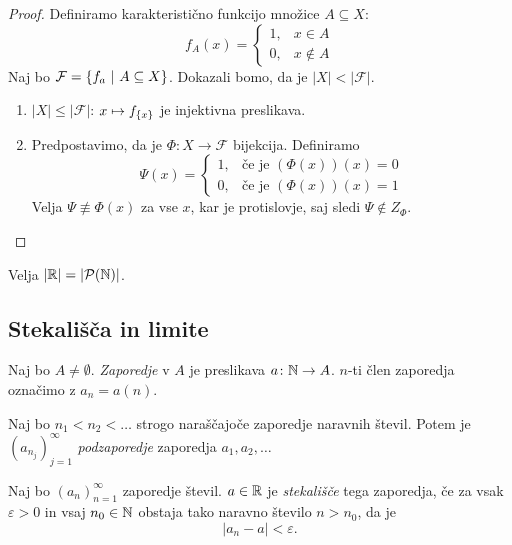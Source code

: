\documentclass[12pt, a4paper]{article}
\begin{document}
\begin{proof}
Definiramo karakteristično funkcijo množice $A\subseteq X$:
\[
f_A(x)=\begin{cases}
1, &x\in A\\
0, &x\not\in A
\end{cases}
\]
Naj bo $\mathcal{F}=\left\{f_a~\middle\vert~A\subseteq X\right\}$. Dokazali bomo, da je $|X|<|\mathcal{F}|$.

\begin{enumerate}[label=\arabic*)]
\item $|X|\leq|\mathcal{F}|$: $x\mapsto f_{\left\{x\right\}}$ je injektivna preslikava.
\item Predpostavimo, da je $\Phi:X\to\mathcal{F}$ bijekcija. Definiramo
\[
\Psi(x)=\begin{cases}
1, &\text{če je $(\Phi(x))(x)=0$}\\
0, &\text{če je $(\Phi(x))(x)=1$}
\end{cases}
\]
Velja $\Psi\not\equiv\Phi(x)$ za vse $x$, kar je protislovje, saj sledi $\Psi\not\in Z_{\Phi}$.\qedhere
\end{enumerate}
\end{proof}

\begin{opomba}
Velja $|\mathbb{R}|=|\mathcal{P}(\mathbb{N})|$.
\end{opomba}

\newpage

\subsection{Stekališča in limite}

\begin{okvir}
\begin{definicija}
Naj bo $A\ne\emptyset$. \emph{Zaporedje} v $A$ je preslikava $a\colon \mathbb{N}\to A$. $n$-ti člen zaporedja označimo z $a_n=a(n)$.
\end{definicija}
\end{okvir}

\begin{definicija}
Naj bo $n_1<n_2<\dots$ strogo naraščajoče zaporedje naravnih števil. Potem je $(a_{n_j})_{j=1}^\infty$ \emph{podzaporedje} zaporedja $a_1,a_2,\dots$
\end{definicija}

\begin{definicija}
Naj bo $(a_n)_{n=1}^\infty$ zaporedje števil. $a\in\mathbb{R}$ je \emph{stekališče} tega zaporedja, če za vsak $\varepsilon>0$ in vsaj $n_0\in\mathbb{N}$ obstaja tako naravno število $n>n_0$, da je
\[
|a_n-a|<\varepsilon.
\]
\end{definicija}
\end{document}
